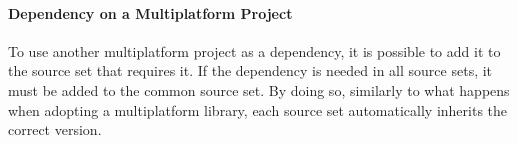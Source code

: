 \paragraph{Dependency on a Multiplatform Project} To use another multiplatform project as a dependency, it is possible to add it to the source set that requires it. If the dependency is needed in all source sets, it must be added to the common source set. By doing so, similarly to what happens when adopting a multiplatform library, each source set automatically inherits the correct version.
